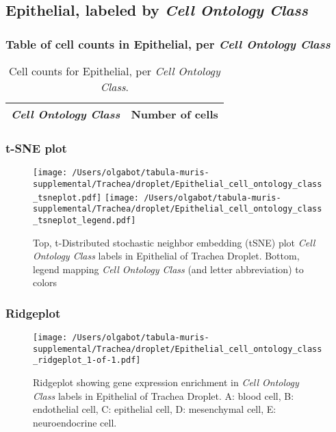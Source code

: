 \clearpage

\subsection{Epithelial, labeled by \emph{Cell Ontology Class}}
\subsubsection{Table of cell counts in Epithelial, per \emph{Cell Ontology Class}}\begin{table}[h]
\centering
\label{my-label}
\begin{tabular}{@{}ll@{}}
\toprule

\emph{Cell Ontology Class}& Number of cells \\ \midrule\bottomrule
\end{tabular}
\caption{Cell counts for Epithelial, per \emph{Cell Ontology Class}.}
\end{table}

\clearpage
\subsubsection{t-SNE plot}
\begin{figure}[h]
\centering
\texttt{[image: /Users/olgabot/tabula-muris-supplemental/Trachea/droplet/Epithelial\_cell\_ontology\_class\_tsneplot.pdf]}
\texttt{[image: /Users/olgabot/tabula-muris-supplemental/Trachea/droplet/Epithelial\_cell\_ontology\_class\_tsneplot\_legend.pdf]}
\caption{Top, t-Distributed stochastic neighbor embedding (tSNE) plot  \emph{Cell Ontology Class} labels in Epithelial of Trachea Droplet. Bottom, legend mapping \emph{Cell Ontology Class} (and letter abbreviation) to colors}
\end{figure}


\clearpage

\subsubsection{Ridgeplot}
\begin{figure}[h]
\centering
\texttt{[image: /Users/olgabot/tabula-muris-supplemental/Trachea/droplet/Epithelial\_cell\_ontology\_class\_ridgeplot\_1-of-1.pdf]}

\caption{ Ridgeplot  showing gene expression enrichment in \emph{Cell Ontology Class} labels in Epithelial of Trachea Droplet. A: blood cell, B: endothelial cell, C: epithelial cell, D: mesenchymal cell, E: neuroendocrine cell.}
\end{figure}



